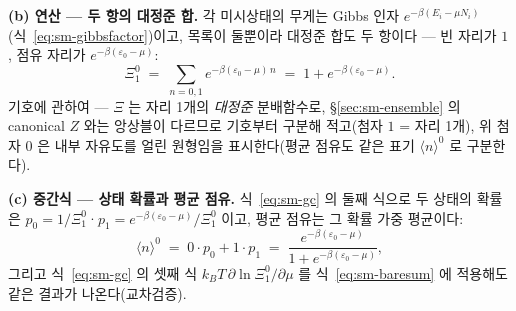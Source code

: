 \textbf{(b) 연산 --- 두 항의 대정준 합.} 각 미시상태의 무게는 Gibbs 인자
$e^{-\beta(E_i-\mu N_i)}$(식~\eqref{eq:sm-gibbsfactor})이고, 목록이 둘뿐이라 대정준 합도 두 항이다 ---
빈 자리가 $1$, 점유 자리가 $e^{-\beta(\varepsilon_0-\mu)}$:
\begin{equation}
\Xi_1^{0}\;=\;\sum_{n=0,1}e^{-\beta(\varepsilon_0-\mu)\,n}
\;=\;1+e^{-\beta(\varepsilon_0-\mu)}.
\label{eq:sm-baresum}
\end{equation}
기호에 관하여 --- $\Xi$ 는 자리 1개의 \emph{대정준} 분배함수로, \S\ref{sec:sm-ensemble} 의 canonical
$Z$ 와는 앙상블이 다르므로 기호부터 구분해 적고(첨자 $1$ = 자리 1개), 위 첨자 $0$ 은 내부 자유도를 얼린
원형임을 표시한다(평균 점유도 같은 표기 $\langle n\rangle^{0}$ 로 구분한다).

\textbf{(c) 중간식 --- 상태 확률과 평균 점유.} 식~\eqref{eq:sm-gc} 의 둘째 식으로 두 상태의 확률은
$p_0=1/\Xi_1^{0}$·$p_1=e^{-\beta(\varepsilon_0-\mu)}/\Xi_1^{0}$ 이고, 평균 점유는 그 확률 가중 평균이다:
\begin{equation}
\langle n\rangle^{0}
\;=\;0\cdot p_0+1\cdot p_1
\;=\;\frac{e^{-\beta(\varepsilon_0-\mu)}}{1+e^{-\beta(\varepsilon_0-\mu)}},
\label{eq:sm-baremid}
\end{equation}
그리고 식~\eqref{eq:sm-gc} 의 셋째 식 $k_BT\,\partial\ln\Xi_1^{0}/\partial\mu$ 를
식~\eqref{eq:sm-baresum} 에 적용해도 같은 결과가 나온다(교차검증).

